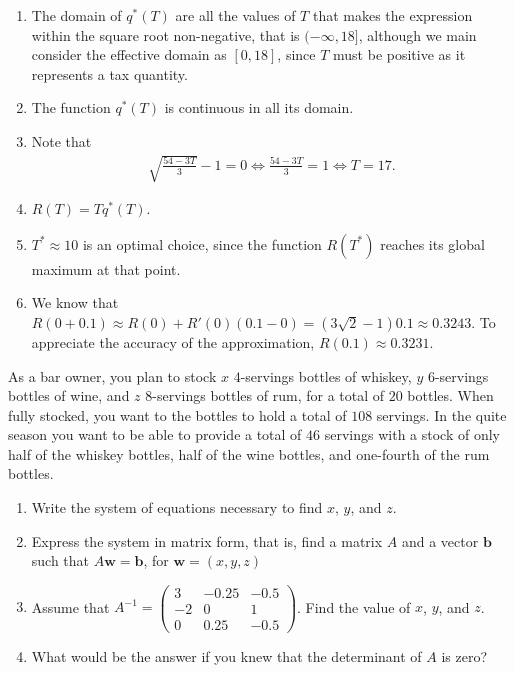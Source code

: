 \documentclass[11pt]{exam}
\begin{document}
\begin{questions}
\begin{solution}[0cm]
\begin{enumerate}[leftmargin = 0.5cm, label = (\alph*), rightmargin = 0.2cm]
        \item The domain of $q^*(T)$ are all the values of $T$ that makes the expression within the square root non-negative, that is $(-\infty, 18]$, although we main consider the effective domain as $[0, 18]$, since $T$ must be positive as it represents a tax quantity.

        \item The function $q^*(T)$ is continuous in all its domain.

        \item Note that
        \begin{align*} 
            \sqrt{\frac{54 - 3T}{3}} - 1 = 0 \Longleftrightarrow \frac{54 - 3T}{3}  = 1 \Longleftrightarrow T = 17.
        \end{align*}

        \item $R(T) = Tq^*(T)$.

        \item $T^*\approx 10$ is an optimal choice, since the function $R(T^*)$ reaches its global maximum at that point.

        \item We know that $R(0 + 0.1) \approx R(0) + R'(0)(0.1 - 0) = (3\sqrt{2} -1)0.1 \approx 0.3243$. To appreciate the accuracy of the approximation, $R(0.1) \approx 0.3231$.
        
    \end{enumerate}
\end{solution}


\question[2]

As a bar owner, you plan to stock $x$ $4$-servings bottles of whiskey, $y$ $6$-servings bottles of wine, and $z$ $8$-servings bottles of rum, for a total of $20$ bottles. When fully stocked, you want to the bottles to hold a total of $108$ servings. In the quite season you want to be able to provide a total of $46$ servings with a stock of only half of the whiskey bottles, half of the wine bottles, and one-fourth of the rum bottles. 

\begin{enumerate}[leftmargin = 0.5cm, label = (\alph*), rightmargin = 0.2cm]
    \item Write the system of equations necessary to find $x$, $y$, and $z$.
    \item Express the system in matrix form, that is, find a matrix $A$ and a vector $\pmb{b}$ such that $A\pmb{w} = \pmb{b}$, for $\pmb{w} = (x, y, z)$ 
    \item Assume that 
    $A^{-1} =
    \begin{pmatrix}
        3 & -0.25 & -0.5 \\
        -2 & 0 & 1 \\
        0 & 0.25 & -0.5
    \end{pmatrix}$. 
    Find the value of $x$, $y$, and $z$. 
    \item What would be the answer if you knew that the determinant of $A$ is zero?
\end{enumerate}


\end{questions}
\end{document}
